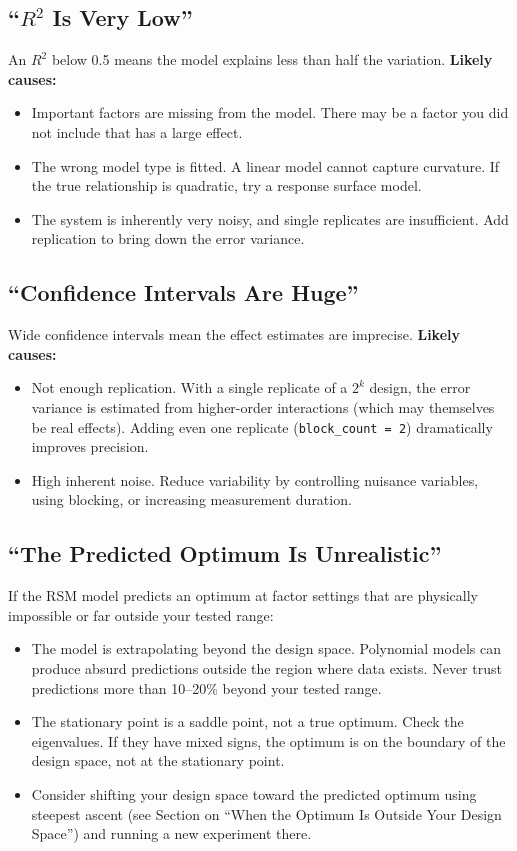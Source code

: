 \documentclass[11pt]{book}
\begin{document}
\subsection{``$R^2$ Is Very Low''}

An $R^2$ below 0.5 means the model explains less than half the variation.
\textbf{Likely causes:}
\begin{itemize}[nosep]
\item Important factors are missing from the model. There may be a factor you
      did not include that has a large effect.
\item The wrong model type is fitted. A linear model cannot capture curvature.
      If the true relationship is quadratic, try a response surface model.
\item The system is inherently very noisy, and single replicates are
      insufficient. Add replication to bring down the error variance.
\end{itemize}

\subsection{``Confidence Intervals Are Huge''}

Wide confidence intervals mean the effect estimates are imprecise.
\textbf{Likely causes:}
\begin{itemize}[nosep]
\item Not enough replication. With a single replicate of a $2^k$ design, the
      error variance is estimated from higher-order interactions (which may
      themselves be real effects). Adding even one replicate (\texttt{block\_count
      = 2}) dramatically improves precision.
\item High inherent noise. Reduce variability by controlling nuisance variables,
      using blocking, or increasing measurement duration.
\end{itemize}

\subsection{``The Predicted Optimum Is Unrealistic''}

If the RSM model predicts an optimum at factor settings that are physically
impossible or far outside your tested range:
\begin{itemize}[nosep]
\item The model is extrapolating beyond the design space. Polynomial models can
      produce absurd predictions outside the region where data exists. Never
      trust predictions more than 10--20\% beyond your tested range.
\item The stationary point is a saddle point, not a true optimum. Check the
      eigenvalues. If they have mixed signs, the optimum is on the boundary of
      the design space, not at the stationary point.
\item Consider shifting your design space toward the predicted optimum using
      steepest ascent (see Section on ``When the Optimum Is Outside Your Design
      Space'') and running a new experiment there.
\end{itemize}
\end{document}
